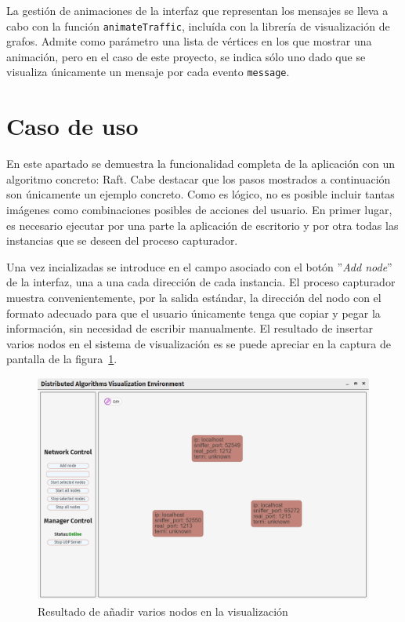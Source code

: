 La gestión de animaciones de la interfaz que representan los mensajes se lleva a cabo con la función \texttt{animateTraffic}, incluída con la librería de visualización de grafos. Admite como parámetro una lista de vértices en los que mostrar una animación, pero en el caso de este proyecto, se indica sólo uno dado que se visualiza únicamente un mensaje por cada evento \texttt{message}.

\section{Caso de uso}

En este apartado se demuestra la funcionalidad completa de la aplicación con un algoritmo concreto: Raft. Cabe destacar que los pasos mostrados a continuación son únicamente un ejemplo concreto. Como es lógico, no es posible incluir tantas imágenes como combinaciones posibles de acciones del usuario. En primer lugar, es necesario ejecutar por una parte la aplicación de escritorio y por otra todas las instancias que se deseen del proceso capturador.

Una vez incializadas se introduce en el campo asociado con el botón ''\textit{Add node}'' de la interfaz, una a una cada dirección de cada instancia. El proceso capturador muestra convenientemente, por la salida estándar, la dirección del nodo con el formato adecuado para que el usuario únicamente tenga que copiar y pegar la información, sin necesidad de escribir manualmente. El resultado de insertar varios nodos en el sistema de visualización es se puede apreciar en la captura de pantalla de la figura~\ref{fig:ui1}.

\begin{figure}[!htb]
  \centering
  \includegraphics[width=0.9\linewidth]{imagenes/ui1}
  \caption{Resultado de añadir varios nodos en la visualización}
  \label{fig:ui1}
\end{figure}

